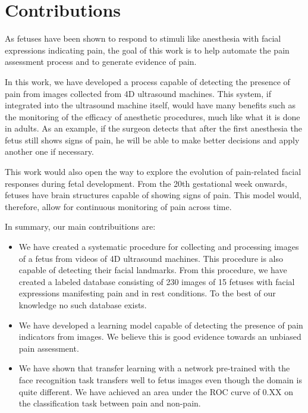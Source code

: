 \documentclass[msc]{ppgccufmg}
\begin{document}
\section{Contributions}

As fetuses have been shown to respond to stimuli like anesthesia with facial expressions indicating pain, the goal of this work is to help automate the pain assessment process and to generate evidence of pain.

In this work, we have developed a process capable of detecting the presence of pain from images collected from 4D ultrasound machines. This system, if integrated into the ultrasound machine itself, would have many benefits such as the monitoring of the efficacy of anesthetic procedures, much like what it is done in adults. As an example, if the surgeon detects that after the first anesthesia the fetus still shows signs of pain, he will be able to make better decisions and apply another one if necessary.

This work would also open the way to explore the evolution of pain-related facial responses during fetal development. From the 20th gestational week onwards, fetuses have brain structures capable of showing signs of pain. This model would, therefore, allow for continuous monitoring of pain across time.

In summary, our main contribuitions are:

\begin{itemize}
    \item We have created a systematic procedure for collecting and processing images of a fetus from videos of 4D ultrasound machines. This procedure is also capable of detecting their facial landmarks. From this procedure, we have created a labeled database consisting of 230 images of 15 fetuses with facial expressions manifesting pain and in rest conditions. To the best of our knowledge no such database exists.
    \item We have developed a learning model capable of detecting the presence of pain indicators from images. We believe this is good evidence towards an unbiased pain assessment.
    \item We have shown that transfer learning with a network pre-trained with the face recognition task transfers well to fetus images even though the domain is quite different. We have achieved an area under the ROC curve of 0.XX on the classification task between pain and non-pain.
\end{itemize}
\end{document}
